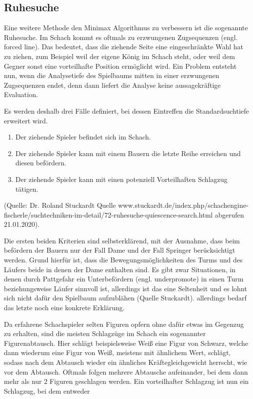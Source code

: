 \subsection{Ruhesuche}

Eine weitere Methode den Minimax Algorithmus zu verbessern ist die sogenannte Ruhesuche.
Im Schach kommt es oftmals zu erzwungenen Zugsequenzen (engl. forced line).
Das bedeutet, dass die ziehende Seite eine eingeschränkte Wahl hat zu ziehen, zum Beispiel weil der eigene König im Schach steht, oder weil dem Gegner sonst eine vorteilhafte Position ermöglicht wird.
Ein Problem entsteht nun, wenn die Analysetiefe des Spielbaums mitten in einer erzwungenen Zugsequenzen endet, denn dann liefert die Analyse keine aussagekräftige Evaluation.

Es werden deshalb drei Fälle definiert, bei dessen Eintreffen die Standardsuchtiefe erweitert wird.

\begin{enumerate}
    \item Der ziehende Spieler befindet sich im Schach.
    \item Der ziehende Spieler kann mit einem Bauern die letzte Reihe erreichen und diesen befördern.
    \item Der ziehende Spieler kann mit einen potenziell Vorteilhaften Schlagzug tätigen.
\end{enumerate}

(Quelle: Dr. Roland Stuckardt Quelle www.stuckardt.de/index.php/schachengine-fischerle/suchtechniken-im-detail/72-ruhesuche-quiescence-search.html abgerufen 21.01.2020).

Die ersten beiden Kriterien sind selbsterklärend, mit der Ausnahme, dass beim befördern der Bauern nur der Fall Dame und der Fall Springer berücksichtigt werden.
Grund hierfür ist, dass die Bewegungsmöglichkeiten des Turms und des Läufers beide in denen der Dame enthalten sind.
Es gibt zwar Situationen, in denen durch Pattgefahr ein Unterbefördern (engl. underpromote) in einen Turm beziehungsweise Läufer sinnvoll ist, allerdings ist das eine Seltenheit und es lohnt sich nicht dafür den Spielbaum aufzublähen (Quelle Stuckardt).
allerdings bedarf das letzte noch eine konkrete Erklärung.

Da erfahrene Schachspieler selten Figuren opfern ohne dafür etwas im Gegenzug zu erhalten, sind die meisten Schlagzüge im Schach ein sogenannter Figurenabtausch.
Hier schlägt beispielsweise Weiß eine Figur von Schwarz, welche dann wiederum eine Figur von Weiß, meistens mit ähnlichem Wert, schlägt, sodass nach dem Abtausch wieder ein ähnliches Kräftegleichgewicht herrscht, wie vor dem Abtausch.
Oftmals folgen mehrere Abtausche aufeinander, bei dem dann mehr als nur 2 Figuren geschlagen werden.
Ein vorteilhafter Schlagzug ist nun ein Schlagzug, bei dem entweder

